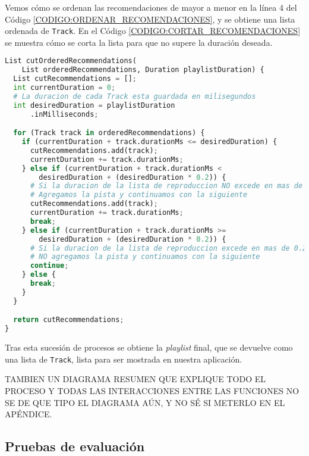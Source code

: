 Vemos cómo se ordenan las recomendaciones de mayor a menor en la línea 4 del Código \ref{CODIGO:ORDENAR_RECOMENDACIONES},
y se obtiene una lista ordenada de \texttt{Track}. En el Código \ref{CODIGO:CORTAR_RECOMENDACIONES} se muestra cómo se corta
la lista para que no supere la duración deseada.

\begin{lstlisting}[language=python, caption=Cortar recomendaciones, label=CODIGO:CORTAR_RECOMENDACIONES]
List cutOrderedRecommendations(
    List orderedRecommendations, Duration playlistDuration) {
  List cutRecommendations = [];
  int currentDuration = 0;
  # La duracion de cada Track esta guardada en milisegundos
  int desiredDuration = playlistDuration
      .inMilliseconds; 

  for (Track track in orderedRecommendations) {
    if (currentDuration + track.durationMs <= desiredDuration) {
      cutRecommendations.add(track);
      currentDuration += track.durationMs;
    } else if (currentDuration + track.durationMs <
        desiredDuration + (desiredDuration * 0.2)) {
      # Si la duracion de la lista de reproduccion NO excede en mas de 0.2 la duracion deseada
      # Agregamos la pista y continuamos con la siguiente
      cutRecommendations.add(track);
      currentDuration += track.durationMs;
      break;
    } else if (currentDuration + track.durationMs >=
        desiredDuration + (desiredDuration * 0.2)) {
      # Si la duracion de la lista de reproduccion excede en mas de 0.2 la duracion deseada
      # NO agregamos la pista y continuamos con la siguiente
      continue;
    } else {
      break;
    }
  }

  return cutRecommendations;
}
\end{lstlisting}

Tras esta sucesión de procesos se obtiene la \textit{playlist} final, que se devuelve como una lista de \texttt{Track},
lista para ser mostrada en nuestra aplicación.


TAMBIEN UN DIAGRAMA RESUMEN QUE EXPLIQUE TODO EL PROCESO Y TODAS LAS INTERACCIONES ENTRE LAS FUNCIONES 
NO SE DE QUE TIPO EL DIAGRAMA AÚN, Y NO SÉ SI METERLO EN EL APÉNDICE.


\subsection{Pruebas de evaluación\label{SEC:PRUEBAS_EVALUACION_IMPLEMENTACION}}

